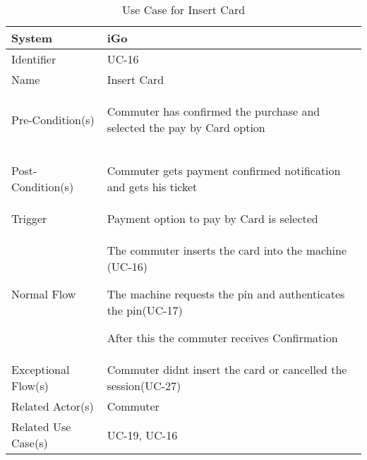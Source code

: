 \begin{table}[ht]
    \centering
    \begin{tabular}{|l|p{11cm}|}
        \hline
        System             & iGo\\
        \hline
        Identifier         & UC-16 \\
        \hline
        Name               & Insert Card \\
        \hline
        Pre-Condition(s)   & 
        \begin{enumerate*}[itemjoin=\newline]
            \item Commuter has confirmed the purchase and selected the pay by Card option
        \end{enumerate*} \\
        \hline
        Post-Condition(s)  & 
        \begin{enumerate*}[itemjoin=\newline]
            \item Commuter gets payment confirmed notification and gets his ticket
        \end{enumerate*} \\
        \hline
        Trigger            & Payment option to pay by Card is selected \\
        \hline
        Normal Flow        & 
        \begin{enumerate*}[itemjoin=\newline]
            \item The commuter inserts the card into the machine (UC-16)
            \item The machine requests the pin and authenticates the pin(UC-17)
            \item After this the commuter receives Confirmation
        \end{enumerate*} \\
        \hline
        Exceptional Flow(s)& Commuter didnt insert the card or cancelled the session(UC-27)\\
        \hline
        Related Actor(s)   & Commuter \\
        \hline
        Related Use Case(s)&  UC-19, UC-16\\
        \hline
    \end{tabular}
    \caption{Use Case for Insert Card}
    \label{tab:UC_InsertCard}
\end{table}
